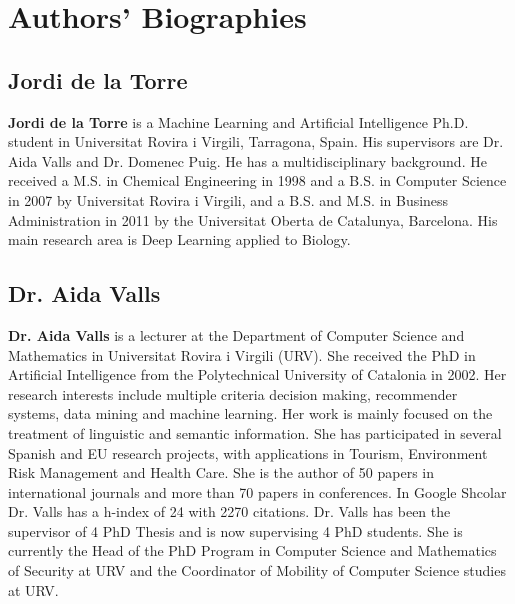 \documentclass{elsarticle}
\begin{document}
	
\section*{Authors' Biographies}

\subsection*{Jordi de la Torre}
\textbf{Jordi de la Torre} is a Machine Learning and Artificial Intelligence Ph.D. student in Universitat Rovira i Virgili, Tarragona, Spain. His supervisors are Dr. Aida Valls and Dr. Domenec Puig. He has a multidisciplinary background. He received a M.S. in Chemical Engineering in 1998 and a B.S. in Computer Science in 2007 by Universitat Rovira i Virgili, and a B.S. and M.S. in Business Administration in 2011 by the Universitat Oberta de Catalunya, Barcelona. His main research area is Deep Learning applied to Biology. 

\subsection*{Dr. Aida Valls}
\textbf{Dr. Aida Valls} is a lecturer at the Department of Computer Science and Mathematics in Universitat Rovira i Virgili (URV). She received the PhD in Artificial Intelligence from the Polytechnical University of Catalonia in 2002. Her research interests include multiple criteria decision making, recommender systems, data mining and machine learning. Her work is mainly focused on the treatment of linguistic and semantic information. She has participated in several Spanish and EU research projects, with applications in Tourism, Environment Risk Management and Health Care. She is the author of 50 papers in international journals and  more than 70 papers in conferences. In Google Shcolar Dr. Valls has a h-index of 24 with 2270 citations. Dr. Valls has been the supervisor of 4 PhD Thesis and is now supervising 4 PhD students. She is currently the Head of the PhD Program in Computer Science and Mathematics of Security at URV and the Coordinator of Mobility of Computer Science studies at URV.
\end{document}
